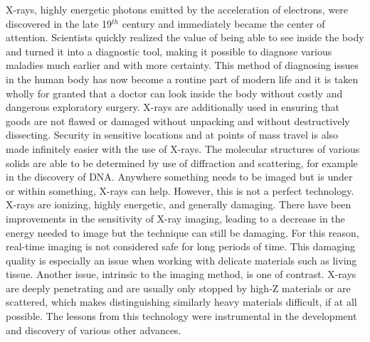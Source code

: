 X-rays, highly energetic photons emitted by the acceleration of electrons, were discovered in the late 19$^{th}$ century and immediately became the center of attention. Scientists quickly realized the value of being able to see inside the body and turned it into a diagnostic tool, making it possible to diagnose various maladies much earlier and with more certainty. This method of diagnosing issues in the human body has now become a routine part of modern life and it is taken wholly for granted that a doctor can look inside the body without costly and dangerous exploratory surgery. X-rays are additionally used in ensuring that goods are not flawed or damaged without unpacking and without destructively dissecting. Security in sensitive locations and at points of mass travel is also made infinitely easier with the use of X-rays. The molecular structures of various solids are able to be determined by use of diffraction and scattering, for example in the discovery of DNA. Anywhere something needs to be imaged but is under or within something, X-rays can help. However, this is not a perfect technology. X-rays are ionizing, highly energetic, and generally damaging. There have been improvements in the sensitivity of X-ray imaging, leading to a decrease in the energy needed to image but the technique can still be damaging. For this reason, real-time imaging is not considered safe for long periods of time. This damaging quality is especially an issue when working with delicate materials such as living tissue. Another issue, intrinsic to the imaging method, is one of contrast. X-rays are deeply penetrating and are usually only stopped by high-Z materials or are scattered, which makes distinguishing similarly heavy materials difficult, if at all possible. The lessons from this technology were instrumental in the development and discovery of various other advances.\\

